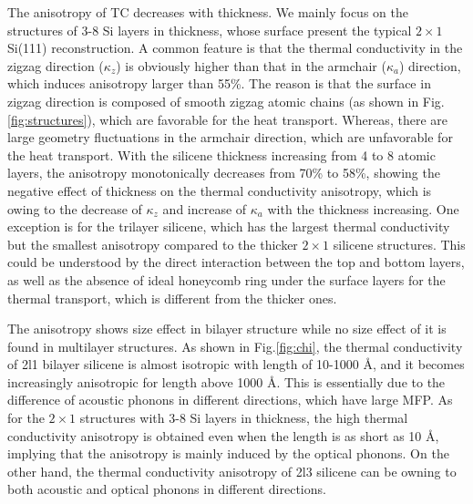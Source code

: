 \documentclass[aps,prb,twocolumn,showpacs,amsmath,amssymb]{revtex4-1}
\newcommand{\angstrom}{\mbox{\normalfont\AA}}
\begin{document}
The anisotropy of TC decreases with thickness. We mainly focus on the structures of 3-8 Si layers in thickness, whose surface present the typical $2 \times 1$ Si(111) reconstruction. A common feature is that the thermal conductivity in the zigzag direction ($\kappa_z$) is obviously higher than that  in the armchair ($\kappa_a$) direction, which induces anisotropy larger than 55\%.
The reason is that the surface in zigzag direction is composed of smooth zigzag atomic chains (as shown in Fig.\ref{fig:structures}), which are favorable for the heat transport. Whereas,  there are large geometry fluctuations in the armchair direction, which are unfavorable for the heat transport.
With the silicene thickness increasing from 4 to 8 atomic layers, the anisotropy monotonically decreases from 70\% to 58\%, showing the negative  effect of thickness on the thermal conductivity anisotropy, which  is owing to the decrease of $\kappa_z$ and increase of $\kappa_a$  with the  thickness increasing.
One exception is for the trilayer silicene, which has the largest thermal conductivity but the smallest  anisotropy compared to the thicker  $2\times1$ silicene structures.  This could be understood by the direct interaction between the top and bottom layers, as well as the absence of ideal honeycomb ring under the surface layers  for the thermal transport, which is different from the thicker ones\cite{Guo2015Structural}.

The anisotropy shows size effect in bilayer structure while no size effect of it is found in multilayer structures. As shown in Fig.\ref{fig:chi}, the thermal conductivity of  2l1 bilayer silicene is almost isotropic with length of 10-1000 \angstrom, and it becomes increasingly anisotropic for length  above 1000  \angstrom. This is essentially due to the difference of acoustic phonons in different directions,  which have large MFP.  As for the $2\times1$ structures with 3-8 Si layers in thickness, the high thermal conductivity anisotropy is obtained even when the length is as short as 10 \angstrom, implying that the anisotropy is  mainly induced by the optical phonons. On the other hand, the thermal conductivity anisotropy of 2l3 silicene can be owning to both acoustic and  optical phonons in different directions.
\end{document}
